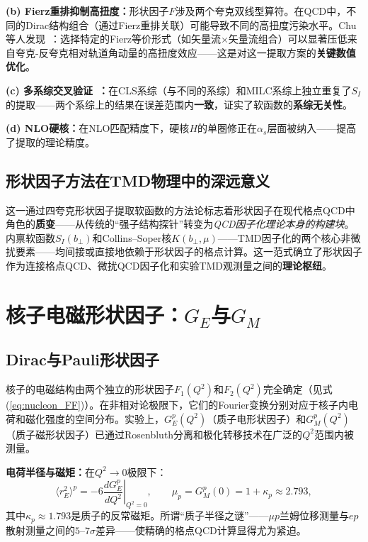 \documentclass[12pt,a4paper]{ctexart}
\theoremstyle{definition}
\begin{document}
\textbf{(b) Fierz重排抑制高扭度：}形状因子$F$涉及两个夸克双线型算符。在QCD中，不同的Dirac结构组合（通过Fierz重排关联）可能导致不同的高扭度污染水平。Chu等人发现~\cite{Chu2023soft}：选择特定的Fierz等价形式（如矢量流$\times$矢量流组合）可以显著压低来自夸克-反夸克相对轨道角动量的高扭度效应——这是对这一提取方案的\textbf{关键数值优化}。

\textbf{(c) 多系综交叉验证~\cite{Chu2023soft}：}在CLS系综（与\cite{LPC2020soft}不同的系综）和MILC系综上独立重复了$S_I$的提取——两个系综上的结果在误差范围内\textbf{一致}，证实了软函数的\textbf{系综无关性}。

\textbf{(d) NLO硬核：}在NLO匹配精度下，硬核$H$的单圈修正在$\alpha_s$层面被纳入——提高了提取的理论精度。

\subsection{形状因子方法在TMD物理中的深远意义}

这一通过四夸克形状因子提取软函数的方法论标志着形状因子在现代格点QCD中角色的\textbf{质变}——从传统的``强子结构探针''转变为\emph{QCD因子化理论本身的构建块}。内禀软函数$S_I(b_\perp)$和Collins--Soper核$K(b_\perp,\mu)$——TMD因子化的两个核心非微扰要素——均间接或直接地依赖于形状因子的格点计算。这一范式确立了形状因子作为连接格点QCD、微扰QCD因子化和实验TMD观测量之间的\textbf{理论枢纽}。

\section{核子电磁形状因子：$G_E$与$G_M$}

\subsection{Dirac与Pauli形状因子}

核子的电磁结构由两个独立的形状因子$F_1(Q^2)$和$F_2(Q^2)$完全确定（见式(\ref{eq:nucleon_FF})）。在非相对论极限下，它们的Fourier变换分别对应于核子内电荷和磁化强度的空间分布。实验上，$G_E^p(Q^2)$（质子电形状因子）和$G_M^p(Q^2)$（质子磁形状因子）已通过Rosenbluth分离和极化转移技术在广泛的$Q^2$范围内被测量。

\textbf{电荷半径与磁矩：}在$Q^2 \to 0$极限下：
\begin{equation}
\langle r_E^2 \rangle^p = -6 \left.\frac{dG_E^p}{dQ^2}\right|_{Q^2=0}, \qquad
\mu_p = G_M^p(0) = 1 + \kappa_p \approx 2.793,
\label{eq:proton_moments}
\end{equation}
其中$\kappa_p \approx 1.793$是质子的反常磁矩。所谓``质子半径之谜''——$\mu p$兰姆位移测量与$ep$散射测量之间的$5\text{--}7\sigma$差异——使精确的格点QCD计算显得尤为紧迫。
\end{document}
